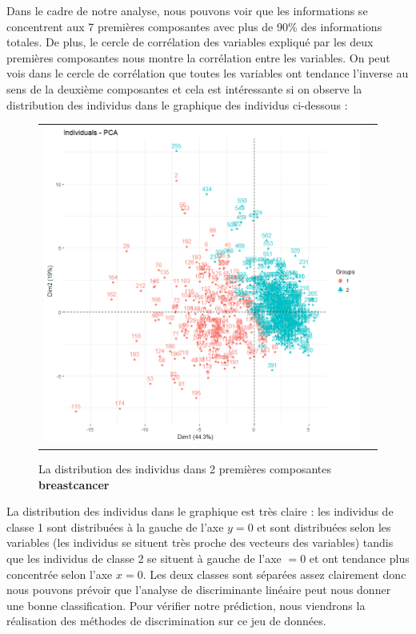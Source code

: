 \documentclass[a4paper,11pt,oneside,roman]{article}
\begin{document}
Dans le cadre de notre analyse, nous pouvons voir que les informations se concentrent aux 7 premières composantes avec plus de 90\% des informations totales. De plus, le cercle de corrélation des variables expliqué par les deux premières composantes nous montre la corrélation entre les variables. On peut vois dans le cercle de corrélation que toutes les variables ont tendance l'inverse au sens de la deuxième composantes et cela est intéressante si on observe la distribution des individus dans le graphique des individus ci-dessous : 
\begin{figure}[htb]
    \centering
    \begin{tabular}{cc}
    \includegraphics[scale = .4]{./discrimination/breastcancer/indi_plot12.png} &
    \end{tabular}
    \caption{La distribution des individus dans 2 premières composantes \textbf{breastcancer}}
    \label{fig:my_label}
\end{figure}
La distribution des individus dans le graphique est très claire : les individus de classe 1 sont distribuées à la gauche de l'axe $y=0$ et sont distribuées selon les variables (les individus se situent très proche des vecteurs des variables) tandis que les individus de classe 2 se situent à gauche de l'axe $=0$ et ont tendance plus concentrée selon l'axe $x=0$. Les deux classes sont séparées assez clairement donc nous pouvons prévoir que l'analyse de discriminante linéaire peut nous donner une bonne classification. Pour vérifier notre prédiction, nous viendrons la réalisation des méthodes de discrimination sur ce jeu de données.
\end{document}
